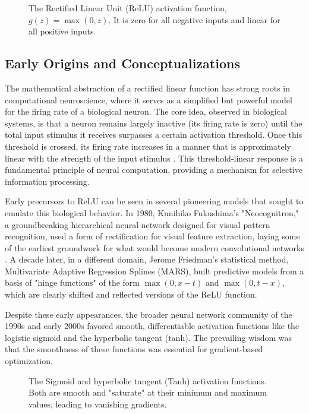 \begin{figure}[h!]
    \centering
    \scalebox{1.0}{\reluplot}
    \caption{The Rectified Linear Unit (ReLU) activation function, $g(z) = \max(0, z)$. It is zero for all negative inputs and linear for all positive inputs.}
    \label{fig:relu_plot}
\end{figure}

\subsection{Early Origins and Conceptualizations}
The mathematical abstraction of a rectified linear function has strong roots in computational neuroscience, where it serves as a simplified but powerful model for the firing rate of a biological neuron. The core idea, observed in biological systems, is that a neuron remains largely inactive (its firing rate is zero) until the total input stimulus it receives surpasses a certain activation threshold. Once this threshold is crossed, its firing rate increases in a manner that is approximately linear with the strength of the input stimulus \cite{Socci1998RectifiedGaussian}. This threshold-linear response is a fundamental principle of neural computation, providing a mechanism for selective information processing.

Early precursors to ReLU can be seen in several pioneering models that sought to emulate this biological behavior. In 1980, Kunihiko Fukushima's "Neocognitron," a groundbreaking hierarchical neural network designed for visual pattern recognition, used a form of rectification for visual feature extraction, laying some of the earliest groundwork for what would become modern convolutional networks \cite{Fukushima1980Neocognitron}. A decade later, in a different domain, Jerome Friedman's statistical method, Multivariate Adaptive Regression Splines (MARS), built predictive models from a basis of "hinge functions" of the form $\max(0, x-t)$ and $\max(0, t-x)$, which are clearly shifted and reflected versions of the ReLU function.

Despite these early appearances, the broader neural network community of the 1990s and early 2000s favored smooth, differentiable activation functions like the logistic sigmoid and the hyperbolic tangent (tanh). The prevailing wisdom was that the smoothness of these functions was essential for gradient-based optimization.

\begin{figure}[h!]
    \centering
    \scalebox{0.9}{\saturatingplot}
    \caption{The Sigmoid and hyperbolic tangent (Tanh) activation functions. Both are smooth and "saturate" at their minimum and maximum values, leading to vanishing gradients.}
    \label{fig:saturating_plot}
\end{figure}

